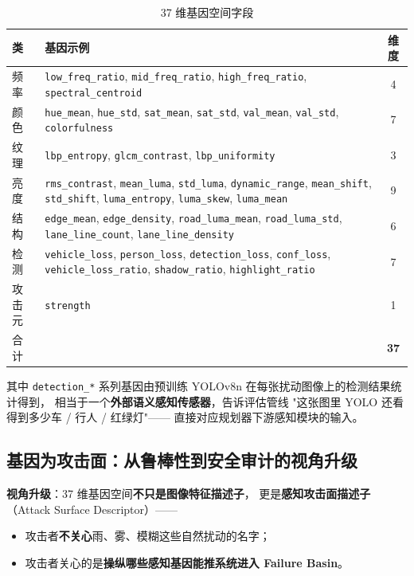 \documentclass[a4paper,12pt,fontset=fandol]{ctexart}
\newcommand{\gene}[1]{\texttt{#1}}
\begin{document}
\begin{table}[H]
\centering
\small
\caption{37 维基因空间字段}
\label{tab:genes}
\begin{tabularx}{\linewidth}{lXc}
\toprule
\textbf{类} & \textbf{基因示例} & \textbf{维度} \\
\midrule
频率 & \gene{low\_freq\_ratio}, \gene{mid\_freq\_ratio}, \gene{high\_freq\_ratio},
      \gene{spectral\_centroid} & 4 \\
颜色 & \gene{hue\_mean}, \gene{hue\_std}, \gene{sat\_mean}, \gene{sat\_std},
      \gene{val\_mean}, \gene{val\_std}, \gene{colorfulness} & 7 \\
纹理 & \gene{lbp\_entropy}, \gene{glcm\_contrast}, \gene{lbp\_uniformity} & 3 \\
亮度 & \gene{rms\_contrast}, \gene{mean\_luma}, \gene{std\_luma}, \gene{dynamic\_range},
      \gene{mean\_shift}, \gene{std\_shift}, \gene{luma\_entropy},
      \gene{luma\_skew}, \gene{luma\_mean} & 9 \\
结构 & \gene{edge\_mean}, \gene{edge\_density}, \gene{road\_luma\_mean},
      \gene{road\_luma\_std}, \gene{lane\_line\_count}, \gene{lane\_line\_density} & 6 \\
检测 & \gene{vehicle\_loss}, \gene{person\_loss}, \gene{detection\_loss},
      \gene{conf\_loss}, \gene{vehicle\_loss\_ratio},
      \gene{shadow\_ratio}, \gene{highlight\_ratio} & 7 \\
攻击元 & \gene{strength} & 1 \\
\midrule
合计 & & \textbf{37} \\
\bottomrule
\end{tabularx}
\end{table}

其中 \gene{detection\_*} 系列基因由预训练 YOLOv8n
在每张扰动图像上的检测结果统计得到，
相当于一个\textbf{外部语义感知传感器}，告诉评估管线
"这张图里 YOLO 还看得到多少车 / 行人 / 红绿灯"——
直接对应规划器下游感知模块的输入。

\subsection{基因为攻击面：从鲁棒性到安全审计的视角升级}

\noindent\textbf{视角升级}：37 维基因空间\textbf{不只是图像特征描述子}，
更是\textbf{感知攻击面描述子}（Attack Surface Descriptor）——

\begin{itemize}[leftmargin=*]
\item 攻击者\textbf{不关心}雨、雾、模糊这些自然扰动的名字；
\item 攻击者关心的是\textbf{操纵哪些感知基因能推系统进入 Failure Basin}。
\end{itemize}
\end{document}
